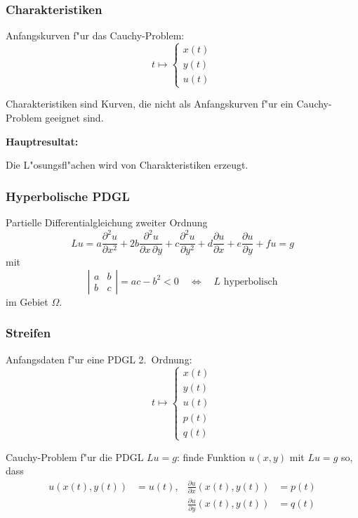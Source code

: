 \documentclass{beamer}
\begin{document}
\begin{frame}
\frametitle{Charakteristiken}

Anfangskurven f"ur das Cauchy-Problem:
\[
t\mapsto \left\{\begin{aligned}
x(t)\\
y(t)\\
u(t)
\end{aligned}\right.
\]

\begin{definition}
Charakteristiken sind Kurven, die nicht als Anfangskurven f"ur ein
Cauchy-Problem geeignet sind.
\end{definition}

\bigskip

{\bf Hauptresultat:}
\medskip

\begin{theorem}
Die L"osungsfl"achen wird von Charakteristiken erzeugt.
\end{theorem}

\end{frame}

\begin{frame}
\frametitle{Hyperbolische PDGL}
Partielle Differentialgleichung zweiter Ordnung
\[
Lu
=
a\frac{\partial^2 u}{\partial x^2}
+
2b \frac{\partial^2 u}{\partial x\,\partial y}
+
c\frac{\partial^2 u}{\partial y^2}
+
d\frac{\partial u}{\partial x}
+
e\frac{\partial u}{\partial y}
+
fu=g
\]
mit
\[
\left|\begin{matrix}
a&b\\b&c
\end{matrix}\right|
=ac-b^2 < 0
\quad\Leftrightarrow\quad
\text{$L$ hyperbolisch}
\]
im Gebiet $\Omega$.
\end{frame}

\begin{frame}
\frametitle{Streifen}

Anfangsdaten f"ur eine PDGL 2.~Ordnung:
\[
t\mapsto
\left\{
\begin{aligned}
x(t)\\
y(t)\\
u(t)\\
p(t)\\
q(t)
\end{aligned}
\right.
\]

\begin{definition}
Cauchy-Problem f"ur die PDGL $Lu = g$: finde Funktion $u(x,y)$ mit $Lu=g$ so,
dass
\begin{align*}
u(x(t),y(t))&=u(t), &\frac{\partial u}{\partial x}(x(t),y(t))&=p(t)\\
            &       &\frac{\partial u}{\partial y}(x(t),y(t))&=q(t)
\end{align*}
\end{definition}

\end{frame}
\end{document}
